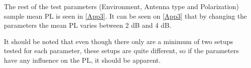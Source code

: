 The rest of the test parameters (Environment, Antenna type and Polarization) sample mean PL is seen in \autoref{App3}. It can be seen on \autoref{App3} that by changing the parameters the mean PL varies between 2 dB and 4 dB.

\begin{table}[H]
\centering
\caption{Difference bewteen setups of different parameters.}
\label{App3}
\end{table}


It should be noted that even though there only are a minimum of two setups tested for each parameter, these setups are quite different, so if the parameters have any influence on the PL, it should be apparent. 






 

